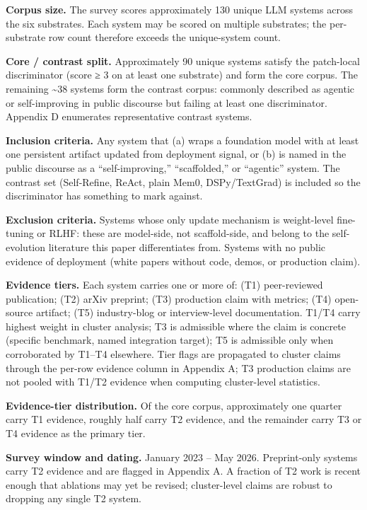 \textbf{Corpus size.} The survey scores approximately 130 unique LLM
systems across the six substrates. Each system may be scored on multiple
substrates; the per-substrate row count therefore exceeds the
unique-system count.

\textbf{Core / contrast split.} Approximately 90 unique systems satisfy
the patch-local discriminator (score ≥ 3 on at least one substrate) and
form the core corpus. The remaining \textasciitilde38 systems form the
contrast corpus: commonly described as agentic or self-improving in
public discourse but failing at least one discriminator. Appendix D
enumerates representative contrast systems.

\textbf{Inclusion criteria.} Any system that (a) wraps a foundation
model with at least one persistent artifact updated from deployment
signal, or (b) is named in the public discourse as a ``self-improving,''
``scaffolded,'' or ``agentic'' system. The contrast set (Self-Refine,
ReAct, plain Mem0, DSPy/TextGrad) is included so the discriminator has
something to mark against.

\textbf{Exclusion criteria.} Systems whose only update mechanism is
weight-level fine-tuning or RLHF: these are model-side, not
scaffold-side, and belong to the self-evolution literature this paper
differentiates from. Systems with no public evidence of deployment
(white papers without code, demos, or production claim).

\textbf{Evidence tiers.} Each system carries one or more of: (T1)
peer-reviewed publication; (T2) arXiv preprint; (T3) production claim
with metrics; (T4) open-source artifact; (T5) industry-blog or
interview-level documentation. T1/T4 carry highest weight in cluster
analysis; T3 is admissible where the claim is concrete (specific
benchmark, named integration target); T5 is admissible only when
corroborated by T1--T4 elsewhere. Tier flags are propagated to cluster
claims through the per-row evidence column in Appendix A; T3 production
claims are not pooled with T1/T2 evidence when computing cluster-level
statistics.

\textbf{Evidence-tier distribution.} Of the core corpus, approximately
one quarter carry T1 evidence, roughly half carry T2 evidence, and the
remainder carry T3 or T4 evidence as the primary tier.

\textbf{Survey window and dating.} January 2023 -- May 2026.
Preprint-only systems carry T2 evidence and are flagged in Appendix A. A
fraction of T2 work is recent enough that ablations may yet be revised;
cluster-level claims are robust to dropping any single T2 system.

